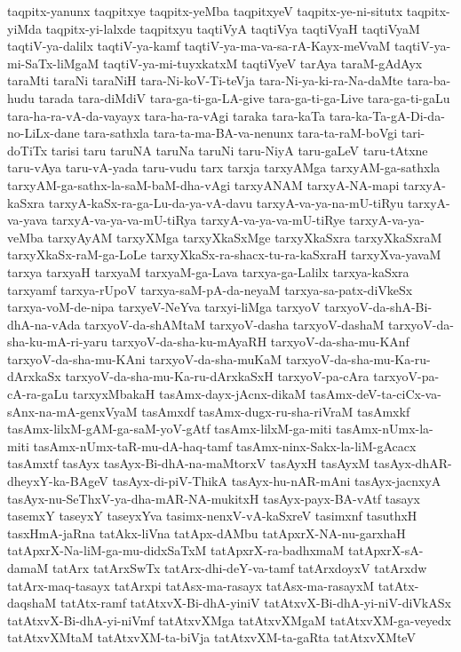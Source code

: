 {taqpitx-yanunx
taqpitxye
taqpitx-yeMba
taqpitxyeV
taqpitx-ye-ni-situtx
taqpitx-yiMda
taqpitx-yi-lalxde
taqpitxyu
taqtiVyA
taqtiVya
taqtiVyaH
taqtiVyaM
taqtiV-ya-dalilx
taqtiV-ya-kamf
taqtiV-ya-ma-va-sa-rA-Kayx-meVvaM
taqtiV-ya-mi-SaTx-liMgaM
taqtiV-ya-mi-tuyxkatxM
taqtiVyeV
tarAya
taraM-gAdAyx
taraMti
taraNi
taraNiH
tara-Ni-koV-Ti-teVja
tara-Ni-ya-ki-ra-Na-daMte
tara-ba-hudu
tarada
tara-diMdiV
tara-ga-ti-ga-LA-give
tara-ga-ti-ga-Live
tara-ga-ti-gaLu
tara-ha-ra-vA-da-vayayx
tara-ha-ra-vAgi
taraka
tara-kaTa
tara-ka-Ta-gA-Di-da-no-LiLx-dane
tara-sathxla
tara-ta-ma-BA-va-nenunx
tara-ta-raM-boVgi
tari-doTiTx
tarisi
taru
taruNA
taruNa
taruNi
taru-NiyA
taru-gaLeV
taru-tAtxne
taru-vAya
taru-vA-yada
taru-vudu
tarx
tarxja
tarxyAMga
tarxyAM-ga-sathxla
tarxyAM-ga-sathx-la-saM-baM-dha-vAgi
tarxyANAM
tarxyA-NA-mapi
tarxyA-kaSxra
tarxyA-kaSx-ra-ga-Lu-da-ya-vA-davu
tarxyA-va-ya-na-mU-tiRyu
tarxyA-va-yava
tarxyA-va-ya-va-mU-tiRya
tarxyA-va-ya-va-mU-tiRye
tarxyA-va-ya-veMba
tarxyAyAM
tarxyXMga
tarxyXkaSxMge
tarxyXkaSxra
tarxyXkaSxraM
tarxyXkaSx-raM-ga-LoLe
tarxyXkaSx-ra-shacx-tu-ra-kaSxraH
tarxyXva-yavaM
tarxya
tarxyaH
tarxyaM
tarxyaM-ga-Lava
tarxya-ga-Lalilx
tarxya-kaSxra
tarxyamf
tarxya-rUpoV
tarxya-saM-pA-da-neyaM
tarxya-sa-patx-diVkeSx
tarxya-voM-de-nipa
tarxyeV-NeYva
tarxyi-liMga
tarxyoV
tarxyoV-da-shA-Bi-dhA-na-vAda
tarxyoV-da-shAMtaM
tarxyoV-dasha
tarxyoV-dashaM
tarxyoV-da-sha-ku-mA-ri-yaru
tarxyoV-da-sha-ku-mAyaRH
tarxyoV-da-sha-mu-KAnf
tarxyoV-da-sha-mu-KAni
tarxyoV-da-sha-muKaM
tarxyoV-da-sha-mu-Ka-ru-dArxkaSx
tarxyoV-da-sha-mu-Ka-ru-dArxkaSxH
tarxyoV-pa-cAra
tarxyoV-pa-cA-ra-gaLu
tarxyxMbakaH
tasAmx-dayx-jAcnx-dikaM
tasAmx-deV-ta-ciCx-va-sAnx-na-mA-genxVyaM
tasAmxdf
tasAmx-dugx-ru-sha-riVraM
tasAmxkf
tasAmx-lilxM-gAM-ga-saM-yoV-gAtf
tasAmx-lilxM-ga-miti
tasAmx-nUmx-la-miti
tasAmx-nUmx-taR-mu-dA-haq-tamf
tasAmx-ninx-Sakx-la-liM-gAcacx
tasAmxtf
tasAyx
tasAyx-Bi-dhA-na-maMtorxV
tasAyxH
tasAyxM
tasAyx-dhAR-dheyxY-ka-BAgeV
tasAyx-di-piV-ThikA
tasAyx-hu-nAR-mAni
tasAyx-jacnxyA
tasAyx-nu-SeThxV-ya-dha-mAR-NA-mukitxH
tasAyx-payx-BA-vAtf
tasayx
tasemxY
taseyxY
taseyxYva
tasimx-nenxV-vA-kaSxreV
tasimxnf
tasuthxH
tasxHmA-jaRna
tatAkx-liVna
tatApx-dAMbu
tatApxrX-NA-nu-garxhaH
tatApxrX-Na-liM-ga-mu-didxSaTxM
tatApxrX-ra-badhxmaM
tatApxrX-sA-damaM
tatArx
tatArxSwTx
tatArx-dhi-deY-va-tamf
tatArxdoyxV
tatArxdw
tatArx-maq-tasayx
tatArxpi
tatAsx-ma-rasayx
tatAsx-ma-rasayxM
tatAtx-daqshaM
tatAtx-ramf
tatAtxvX-Bi-dhA-yiniV
tatAtxvX-Bi-dhA-yi-niV-diVkASx
tatAtxvX-Bi-dhA-yi-niVmf
tatAtxvXMga
tatAtxvXMgaM
tatAtxvXM-ga-veyedx
tatAtxvXMtaM
tatAtxvXM-ta-biVja
tatAtxvXM-ta-gaRta
tatAtxvXMteV
}
